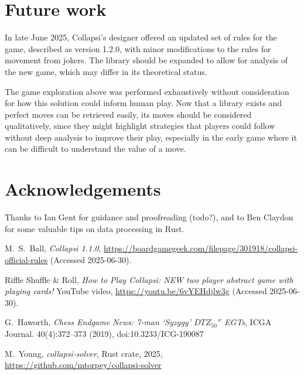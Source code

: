 \documentclass[a4paper, twocolumn]{article}
\begin{document}
\section{Future work}

In late June 2025, Collapsi's designer offered an updated set of rules for the
game, described as version 1.2.0, with minor modifications to the rules for movement from
jokers. The library should be expanded to allow for analysis of the new game,
which may differ in its theoretical status.

The game exploration above was performed exhaustively without consideration for how
this solution could inform human play. Now that a library exists and perfect
moves can be retrieved easily, its moves should be considered qualitatively,
since they might highlight strategies that players could follow without deep
analysis to improve their play, especially in the early game where it can be
difficult to understand the value of a move.


\section{Acknowledgements}

Thanks to Ian Gent for guidance and proofreading (todo?), and to Ben Claydon for
some valuable tips on data processing in Rust.


\begin{thebibliography}{9}

  M.~S.~Ball,
  \textit{Collapsi 1.1.0},
  \url{https://boardgamegeek.com/filepage/301918/collapsi-official-rules}
  (Accessed 2025-06-30).

  Riffle Shuffle \& Roll,
  \textit{How to Play Collapsi: NEW two player abstract game with playing cards!}
  YouTube video,
  \url{https://youtu.be/6vYEHdjlw3g}
  (Accessed 2025-06-30).

  G.~Haworth,
  \textit{Chess Endgame News: 7-man `Syzygy' $DTZ_{50}''$ EGTs},
  ICGA Journal. 40(4):372--373 (2019),
  doi:10.3233/ICG-190087

  M.~Young,
  \textit{collapsi-solver},
  Rust crate,
  2025,
  \url{https://github.com/mtorpey/collapsi-solver}

\end{thebibliography}
\end{document}
